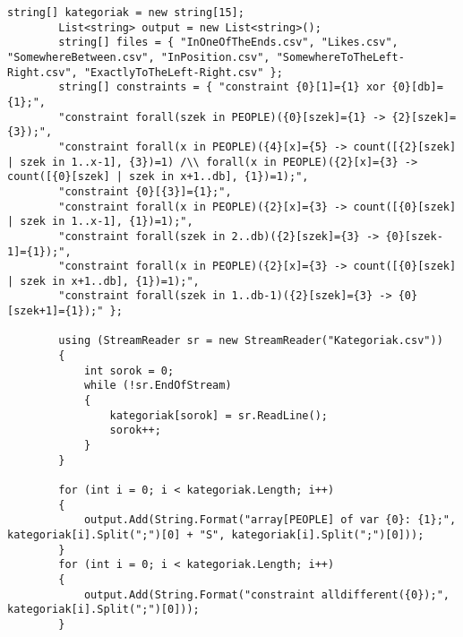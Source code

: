 \documentclass[12pt,a4paper]{report}
\begin{document}
    
	\begin{lstlisting}[caption=Kód generátor forráskódrészlete, label=code]
		string[] kategoriak = new string[15];
		List<string> output = new List<string>();
		string[] files = { "InOneOfTheEnds.csv", "Likes.csv", "SomewhereBetween.csv", "InPosition.csv", "SomewhereToTheLeft-Right.csv", "ExactlyToTheLeft-Right.csv" };
		string[] constraints = { "constraint {0}[1]={1} xor {0}[db]={1};",
		"constraint forall(szek in PEOPLE)({0}[szek]={1} -> {2}[szek]={3});",
		"constraint forall(x in PEOPLE)({4}[x]={5} -> count([{2}[szek] | szek in 1..x-1], {3})=1) /\\ forall(x in PEOPLE)({2}[x]={3} -> count([{0}[szek] | szek in x+1..db], {1})=1);",
		"constraint {0}[{3}]={1};",
		"constraint forall(x in PEOPLE)({2}[x]={3} -> count([{0}[szek] | szek in 1..x-1], {1})=1);",
		"constraint forall(szek in 2..db)({2}[szek]={3} -> {0}[szek-1]={1});",
		"constraint forall(x in PEOPLE)({2}[x]={3} -> count([{0}[szek] | szek in x+1..db], {1})=1);",
		"constraint forall(szek in 1..db-1)({2}[szek]={3} -> {0}[szek+1]={1});" };
		
		using (StreamReader sr = new StreamReader("Kategoriak.csv"))
		{
			int sorok = 0;
			while (!sr.EndOfStream)
			{
				kategoriak[sorok] = sr.ReadLine();
				sorok++;
			}
		}
		
		for (int i = 0; i < kategoriak.Length; i++)
		{
			output.Add(String.Format("array[PEOPLE] of var {0}: {1};", kategoriak[i].Split(";")[0] + "S", kategoriak[i].Split(";")[0]));
		}
		for (int i = 0; i < kategoriak.Length; i++)
		{
			output.Add(String.Format("constraint alldifferent({0});", kategoriak[i].Split(";")[0]));
		}
	\end{lstlisting}
    
\end{document}
